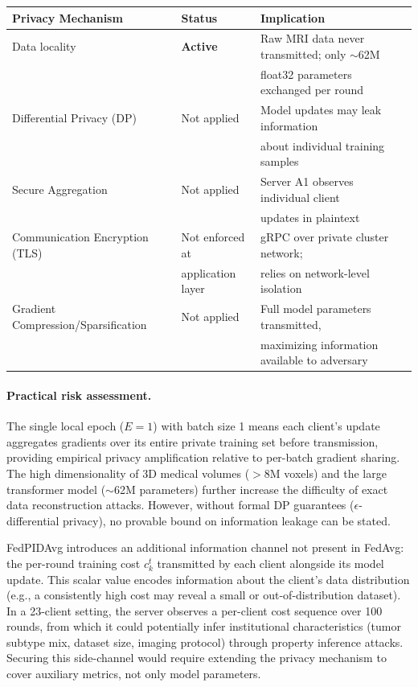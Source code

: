 \documentclass{article}
\begin{document}
\begin{table}[h]
\centering
\begin{tabular}{lll}
\toprule
\textbf{Privacy Mechanism} & \textbf{Status} & \textbf{Implication} \\
\midrule
Data locality & \textbf{Active} & Raw MRI data never transmitted; only $\sim$62M \\
 & & float32 parameters exchanged per round \\
Differential Privacy (DP) & Not applied & Model updates may leak information \\
 & & about individual training samples \\
Secure Aggregation & Not applied & Server A1 observes individual client \\
 & & updates in plaintext \\
Communication Encryption (TLS) & Not enforced at & gRPC over private cluster network; \\
 & application layer & relies on network-level isolation \\
Gradient Compression/Sparsification & Not applied & Full model parameters transmitted, \\
 & & maximizing information available to adversary \\
\bottomrule
\end{tabular}
\end{table}

\paragraph{Practical risk assessment.} The single local epoch ($E = 1$) with batch size 1 means each client's update aggregates gradients over its entire private training set before transmission, providing empirical privacy amplification relative to per-batch gradient sharing. The high dimensionality of 3D medical volumes ($>$8M voxels) and the large transformer model ($\sim$62M parameters) further increase the difficulty of exact data reconstruction attacks. However, without formal DP guarantees ($\epsilon$-differential privacy), no provable bound on information leakage can be stated.

FedPIDAvg introduces an additional information channel not present in FedAvg: the per-round training cost $c_k^t$ transmitted by each client alongside its model update. This scalar value encodes information about the client's data distribution (e.g., a consistently high cost may reveal a small or out-of-distribution dataset). In a 23-client setting, the server observes a per-client cost sequence over 100 rounds, from which it could potentially infer institutional characteristics (tumor subtype mix, dataset size, imaging protocol) through property inference attacks. Securing this side-channel would require extending the privacy mechanism to cover auxiliary metrics, not only model parameters.
\end{document}
